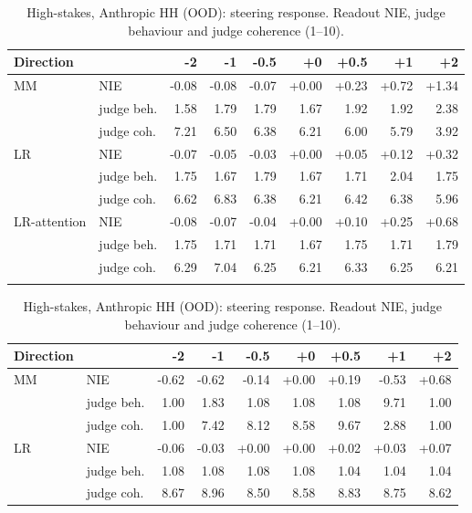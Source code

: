 \begin{table}[H]
\centering
\begin{minipage}[t]{0.49\textwidth}
\centering
\centering
\scriptsize
\setlength{\tabcolsep}{3pt}
\begin{tabular}{llrrrrrrr}
\toprule
Direction & & -2 & -1 & -0.5 & +0 & +0.5 & +1 & +2 \\
\midrule
MM & NIE & -0.08 & -0.08 & -0.07 & +0.00 & +0.23 & +0.72 & +1.34 \\
 & judge beh. & 1.58 & 1.79 & 1.79 & 1.67 & 1.92 & 1.92 & 2.38 \\
 & judge coh. & 7.21 & 6.50 & 6.38 & 6.21 & 6.00 & 5.79 & 3.92 \\
\addlinespace[2pt]
LR & NIE & -0.07 & -0.05 & -0.03 & +0.00 & +0.05 & +0.12 & +0.32 \\
 & judge beh. & 1.75 & 1.67 & 1.79 & 1.67 & 1.71 & 2.04 & 1.75 \\
 & judge coh. & 6.62 & 6.83 & 6.38 & 6.21 & 6.42 & 6.38 & 5.96 \\
\addlinespace[2pt]
LR-attention & NIE & -0.08 & -0.07 & -0.04 & +0.00 & +0.10 & +0.25 & +0.68 \\
 & judge beh. & 1.75 & 1.71 & 1.71 & 1.67 & 1.75 & 1.71 & 1.79 \\
 & judge coh. & 6.29 & 7.04 & 6.25 & 6.21 & 6.33 & 6.25 & 6.21 \\
\addlinespace[2pt]
\bottomrule
\end{tabular}
\caption{High-stakes, Anthropic HH (OOD): steering response. Readout NIE, judge behaviour and judge coherence (1--10).}
\label{tab:app-steer-highstakes-AnthropicHHOOD}
\end{minipage}
\hfill
\begin{minipage}[t]{0.49\textwidth}
\centering
\centering
\scriptsize
\setlength{\tabcolsep}{3pt}
\begin{tabular}{llrrrrrrr}
\toprule
Direction & & -2 & -1 & -0.5 & +0 & +0.5 & +1 & +2 \\
\midrule
MM & NIE & -0.62 & -0.62 & -0.14 & +0.00 & +0.19 & -0.53 & +0.68 \\
 & judge beh. & 1.00 & 1.83 & 1.08 & 1.08 & 1.08 & 9.71 & 1.00 \\
 & judge coh. & 1.00 & 7.42 & 8.12 & 8.58 & 9.67 & 2.88 & 1.00 \\
\addlinespace[2pt]
LR & NIE & -0.06 & -0.03 & +0.00 & +0.00 & +0.02 & +0.03 & +0.07 \\
 & judge beh. & 1.08 & 1.08 & 1.08 & 1.08 & 1.04 & 1.04 & 1.04 \\
 & judge coh. & 8.67 & 8.96 & 8.50 & 8.58 & 8.83 & 8.75 & 8.62 \\

\end{tabular}
\end{minipage}
\end{table}
